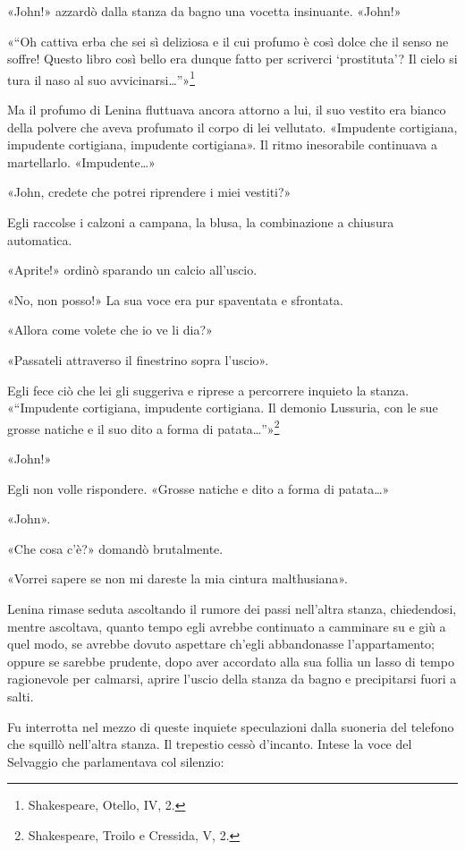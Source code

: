\documentclass[
a5paper, %
10pt, %
twoside, 
onecolumn, %
openany, %
]{memoir}
\begin{document}
«John!» azzardò dalla stanza da bagno una vocetta insinuante. «John!»

«“Oh cattiva erba che sei sì deliziosa e il cui profumo è così dolce che il senso ne soffre! Questo libro così bello era dunque fatto per scriverci ‘prostituta’? Il cielo si tura il naso al suo avvicinarsi…”»\footnote{Shakespeare, Otello, IV, 2.}

Ma il profumo di Lenina fluttuava ancora attorno a lui, il suo vestito era bianco della polvere che aveva profumato il corpo di lei vellutato. «Impudente cortigiana, impudente cortigiana, impudente cortigiana». Il ritmo inesorabile continuava a martellarlo. «Impudente…»

«John, credete che potrei riprendere i miei vestiti?»

Egli raccolse i calzoni a campana, la blusa, la combinazione a chiusura automatica.

«Aprite!» ordinò sparando un calcio all’uscio.

«No, non posso!» La sua voce era pur spaventata e sfrontata.

«Allora come volete che io ve li dia?»

«Passateli attraverso il finestrino sopra l’uscio».

Egli fece ciò che lei gli suggeriva e riprese a percorrere inquieto la stanza. «“Impudente cortigiana, impudente cortigiana. Il demonio Lussuria, con le sue grosse natiche e il suo dito a forma di patata…”»\footnote{Shakespeare, Troilo e Cressida, V, 2.}

«John!»

Egli non volle rispondere. «Grosse natiche e dito a forma di patata…»

«John».

«Che cosa c’è?» domandò brutalmente.

«Vorrei sapere se non mi dareste la mia cintura malthusiana».

Lenina rimase seduta ascoltando il rumore dei passi nell’altra stanza, chiedendosi, mentre ascoltava, quanto tempo egli avrebbe continuato a camminare su e giù a quel modo, se avrebbe dovuto aspettare ch’egli abbandonasse l’appartamento; oppure se sarebbe prudente, dopo aver accordato alla sua follia un lasso di tempo ragionevole per calmarsi, aprire l’uscio della stanza da bagno e precipitarsi fuori a salti.

Fu interrotta nel mezzo di queste inquiete speculazioni dalla suoneria del telefono che squillò nell’altra stanza. Il trepestio cessò d’incanto. Intese la voce del Selvaggio che parlamentava col silenzio:
\end{document}
